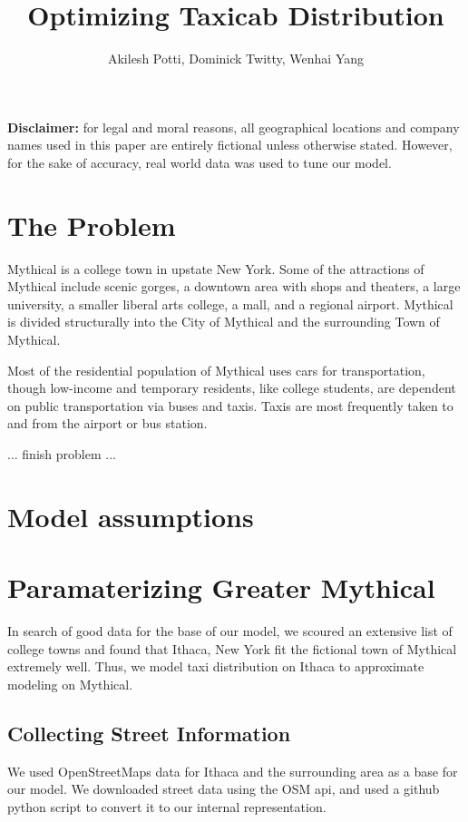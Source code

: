 \documentclass{article}
\begin{document}
\title{Optimizing Taxicab Distribution}
\author{Akilesh Potti, Dominick Twitty, Wenhai Yang}
\maketitle

\begin{abstract}
\end{abstract}

\noindent\textbf{Disclaimer:} for legal and moral reasons, all geographical locations and company names used in this paper are entirely fictional unless otherwise stated. However, for the sake of accuracy, real world data was used to tune our model.

\section{The Problem}
Mythical is a college town in upstate New York. Some of the attractions of Mythical include scenic gorges, a downtown area with shops and theaters, a large university, a smaller liberal arts college, a mall, and a regional airport. Mythical is divided structurally into the City of Mythical and the surrounding Town of Mythical. 

Most of the residential population of Mythical uses cars for transportation, though low-income and temporary residents, like college students, are dependent on public transportation via buses and taxis. Taxis are most frequently taken to and from the airport or bus station.

... finish problem ...

\section{Model assumptions}

\section{Paramaterizing Greater Mythical}
In search of good data for the base of our model, we scoured an extensive list of college towns and found that Ithaca, New York fit the fictional town of Mythical extremely well. Thus, we model taxi distribution on Ithaca to approximate modeling on Mythical.

\subsection{Collecting Street Information}
We used OpenStreetMaps data for Ithaca and the surrounding area as a base for our model. We downloaded street data using the OSM api, and used a github python script to convert it to our internal representation. 
\end{document}
